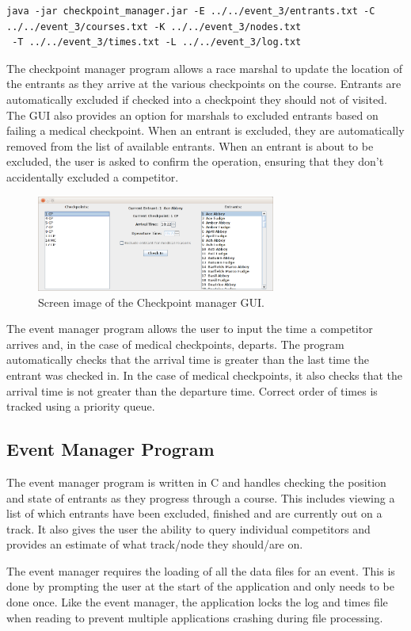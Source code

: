\documentclass{article}
\begin{document}
\begin{center}
	\begin{lstlisting}[showstringspaces=false]
java -jar checkpoint_manager.jar -E ../../event_3/entrants.txt -C ../../event_3/courses.txt -K ../../event_3/nodes.txt
 -T ../../event_3/times.txt -L ../../event_3/log.txt

	\end{lstlisting}
\end{center}

The checkpoint manager program allows a race marshal to update the location of the entrants as they arrive at the various checkpoints on the course. Entrants are automatically excluded if checked into a checkpoint they should not of visited. The GUI also provides an option for marshals to excluded entrants based on failing a medical checkpoint. When an entrant is excluded, they are automatically removed from the list of available entrants. When an entrant is about to be excluded, the user is asked to confirm the operation, ensuring that they don't accidentally excluded a competitor.


\begin{figure}[H]
\centering
\includegraphics[width=0.7\textwidth]{img/GUI-screenshot.png}
\caption{Screen image of the Checkpoint manager GUI.}
\label{fig:GUI-image}
\end{figure}

The event manager program allows the user to input the time a competitor arrives and, in the case of medical checkpoints, departs. The program automatically checks that the arrival time is greater than the last time the entrant was checked in. In the case of medical checkpoints, it also checks that the arrival time is not greater than the departure time. Correct order of times is tracked using a priority queue.

\subsection{Event Manager Program}
The event manager program is written in C and handles checking the position and state of entrants as they progress through a course. This includes viewing a list of which entrants have been excluded, finished and are currently out on a track. It also gives the user the ability to query individual competitors and provides an estimate of what track/node they should/are on.

The event manager requires the loading of all the data files for an event. This is done by prompting the user at the start of the application and only needs to be done once. Like the event manager, the application locks the log and times file when reading to prevent multiple applications crashing during file processing.
\end{document}

